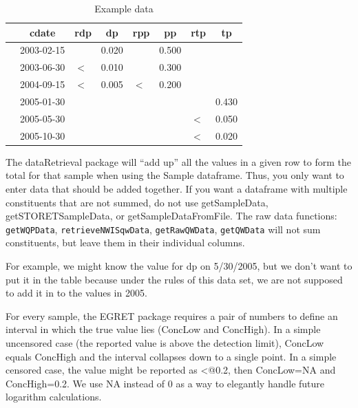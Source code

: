 \documentclass[a4paper,11pt]{article}\usepackage[]{graphicx}\usepackage[]{color}
\begin{document}
\begin{table}[ht]
\caption{Example data} 
\label{tab:exampleComplexQW}
{\footnotesize
\begin{tabular}{rllrlrlr}
  \hline
 & \multicolumn{1}{c}{\textbf{\textsf{cdate}}} & \multicolumn{1}{c}{\textbf{\textsf{rdp}}} & \multicolumn{1}{c}{\textbf{\textsf{dp}}} & \multicolumn{1}{c}{\textbf{\textsf{rpp}}} & \multicolumn{1}{c}{\textbf{\textsf{pp}}} & \multicolumn{1}{c}{\textbf{\textsf{rtp}}} & \multicolumn{1}{c}{\textbf{\textsf{tp}}} \\ 
  \hline
 & 2003-02-15 &  & 0.020 &  & 0.500 &  &  \\ 
  [5pt] & 2003-06-30 & $<$ & 0.010 &  & 0.300 &  &  \\ 
  [5pt] & 2004-09-15 & $<$ & 0.005 & $<$ & 0.200 &  &  \\ 
  [5pt] & 2005-01-30 &  &  &  &  &  & 0.430 \\ 
  [5pt] & 2005-05-30 &  &  &  &  & $<$ & 0.050 \\ 
  [5pt] & 2005-10-30 &  &  &  &  & $<$ & 0.020 \\ 
   \hline
\end{tabular}
}
\end{table}


The dataRetrieval package will \enquote{add up} all the values in a given row to form the total for that sample when using the Sample dataframe. Thus, you only want to enter data that should be added together. If you want a dataframe with multiple constituents that are not summed, do not use getSampleData, getSTORETSampleData, or getSampleDataFromFile. The raw data functions: \texttt{getWQPData}, \texttt{retrieveNWISqwData}, \texttt{getRawQWData}, \texttt{getQWData} will not sum constituents, but leave them in their individual columns. 

For example, we might know the value for dp on 5/30/2005, but we don't want to put it in the table because under the rules of this data set, we are not supposed to add it in to the values in 2005.

For every sample, the EGRET package requires a pair of numbers to define an interval in which the true value lies (ConcLow and ConcHigh). In a simple uncensored case (the reported value is above the detection limit), ConcLow equals ConcHigh and the interval collapses down to a single point. In a simple censored case, the value might be reported as \verb@<@0.2, then ConcLow=NA and ConcHigh=0.2. We use NA instead of 0 as a way to elegantly handle future logarithm calculations.
\end{document}
